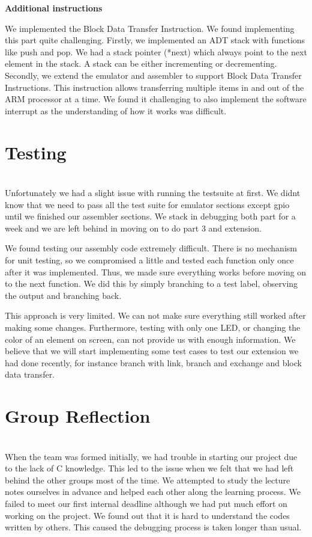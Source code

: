 \documentclass[11pt]{article}
\begin{document}
  \begin{table}[h]
        \centering
      \caption*{\bf Additional instructions}
    \end{table}

    We implemented the Block Data Transfer Instruction. We found implementing
    this part quite challenging. Firstly, we implemented an ADT stack with
    functions like push and pop. We had a stack pointer (*next) which always
    point to the next element in the stack. A stack can be either incrementing
    or decrementing. Secondly, we extend the emulator and assembler to support
     Block Data Transfer Instructions. This instruction allows transferring
     multiple items in and out of the ARM processor at a time. We found it
     challenging to also implement the software interrupt as the understanding
     of how it works was difficult.





\section{Testing} \hfill \\
    Unfortunately we had a slight issue with running the testsuite at first. We
     didnt know that we need to pass all the test suite for emulator sections
     except gpio until we finished our assembler sections. We stack in debugging
      both part for a week and we are left behind in moving on to do part 3 and
      extension.

    We found testing our assembly code extremely difficult. There is no
    mechanism for unit testing, so we compromised a little and tested each
     function only once after it was implemented. Thus, we made sure everything
     works before moving on to the next function. We did this by simply
     branching to a test label, observing the output and branching back.

    This approach is very limited. We can not make sure everything still worked
     after making some changes. Furthermore, testing with only one LED, or
     changing the color of an element on screen, can not provide us with enough
      information. We believe that we will start implementing some test cases
      to test our extension we had done recently, for instance branch with link,
       branch and exchange and block data transfer.



\section{Group Reflection} \hfill \\
When the team was formed initially, we had trouble in starting our project due
to the lack of C knowledge. This led to the issue when we felt that we had left
 behind the other groups most of the time. We attempted to study the lecture
 notes ourselves in advance and helped each other along the learning process.
 We failed to meet our first internal deadline although we had put much effort
 on working on the project. We found out that it is hard to understand the codes
  written by others. This caused the debugging process is taken longer than
  usual.
\end{document}
